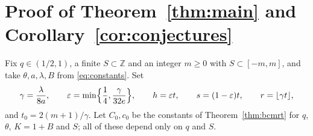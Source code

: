 \documentclass[11pt]{amsart}
\theoremstyle{remark}
\newcommand{\Z}{\mathbb{Z}}
\begin{document}
\section{Proof of Theorem~\ref{thm:main} and Corollary~\ref{cor:conjectures}}\label{sec:proof}

Fix $q\in(1/2,1)$, a finite $S\subset\Z$ and an integer $m\ge0$ with $S\subset[-m,m]$, and take
$\theta,a,\lambda,B$ from \eqref{eq:constants}. Set
\begin{equation}\label{eq:parameters}
\gamma=\frac{\lambda}{8a},\qquad \varepsilon=\min\Bigl\{\frac14,\frac{\gamma}{32e}\Bigr\},\qquad
h=\varepsilon t,\qquad s=(1-\varepsilon)t,\qquad r=\lfloor\gamma t\rfloor,
\end{equation}
and $t_0=2(m+1)/\gamma$. Let $C_0,c_0$ be the constants of Theorem~\ref{thm:bcmrt} for
$q$, $\theta$, $K=1+B$ and $S$; all of these depend only on $q$ and $S$.
\end{document}
